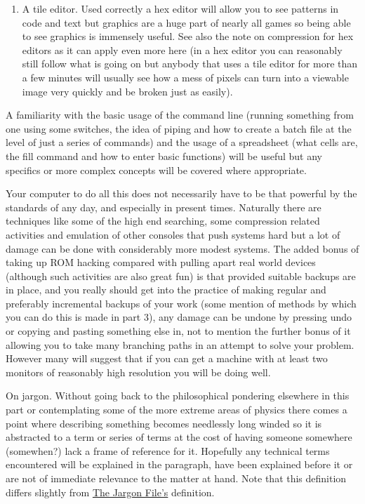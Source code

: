 \documentclass[
]{book}
\begin{document}
\begin{enumerate}
\item
  A tile editor. Used correctly a hex editor will allow you to see patterns in code and text but graphics are a huge part of nearly all games so being able to see graphics is immensely useful. See also the note on compression for hex editors as it can apply even more here (in a hex editor you can reasonably still follow what is going on but anybody that uses a tile editor for more than a few minutes will usually see how a mess of pixels can turn into a viewable image very quickly and be broken just as easily).
\end{enumerate}

A familiarity with the basic usage of the command line (running something from one using some switches, the idea of piping and how to create a batch file at the level of just a series of commands) and the usage of a spreadsheet (what cells are, the fill command and how to enter basic functions) will be useful but any specifics or more complex concepts will be covered where appropriate.

Your computer to do all this does not necessarily have to be that powerful by the standards of any day, and especially in present times. Naturally there are techniques like some of the high end searching, some compression related activities and emulation of other consoles that push systems hard but a lot of damage can be done with considerably more modest systems. The added bonus of taking up ROM hacking compared with pulling apart real world devices (although such activities are also great fun) is that provided suitable backups are in place, and you really should get into the practice of making regular and preferably incremental backups of your work (some mention of methods by which you can do this is made in part 3), any damage can be undone by pressing undo or copying and pasting something else in, not to mention the further bonus of it allowing you to take many branching paths in an attempt to solve your problem. However many will suggest that if you can get a machine with at least two monitors of reasonably high resolution you will be doing well.

On jargon. Without going back to the philosophical pondering elsewhere in this part or contemplating some of the more extreme areas of physics there comes a point where describing something becomes needlessly long winded so it is abstracted to a term or series of terms at the cost of having someone somewhere (somewhen?) lack a frame of reference for it. Hopefully any technical terms encountered will be explained in the paragraph, have been explained before it or are not of immediate relevance to the matter at hand. Note that this definition differs slightly from \href{http://www.catb.org/~esr/jargon/html/distinctions.html}{The Jargon File's} definition.
\end{document}
